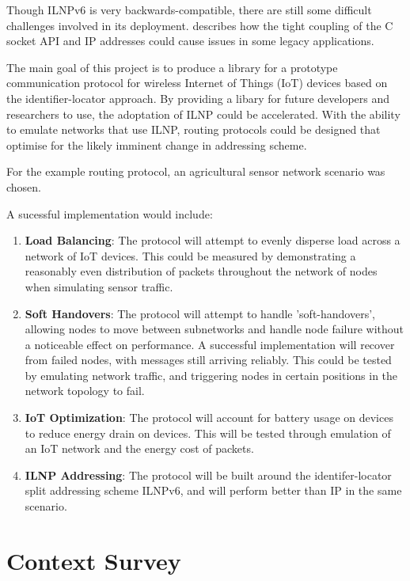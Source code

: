 \documentclass[12pt]{article}
\begin{document}
Though ILNPv6 is very backwards-compatible, there are still some difficult challenges involved in its deployment. \cite{ipwithoutip} describes how the tight coupling of the C socket API and IP addresses could cause issues in some legacy applications. 

The main goal of this project is to produce a library for a prototype communication
protocol for wireless Internet of Things (IoT) devices based on the identifier-locator approach. By providing a libary for future developers and researchers to use, the adoptation of ILNP could be accelerated. With the ability to emulate networks that use ILNP, routing protocols could be designed that optimise for the likely imminent change in addressing scheme. 

For the example routing protocol, an agricultural sensor network scenario was chosen. 

\vspace{\baselineskip}
\noindent A sucessful implementation would include:

\begin{enumerate}
	\item \textbf{Load Balancing}: The protocol will attempt to evenly disperse load across a network of IoT
devices. This could be measured by demonstrating a reasonably even distribution of packets throughout the network of nodes when simulating sensor traffic. 
	\item \textbf{Soft Handovers}: The protocol will attempt to handle ’soft-handovers’, allowing nodes to
move between subnetworks and handle node failure without a noticeable effect on performance. A successful implementation will recover from failed nodes, with messages still arriving reliably. This could be tested by emulating network traffic, and triggering nodes in certain positions in the network topology to fail.

	\item \textbf{IoT Optimization}: The protocol will account for battery usage on devices to reduce energy drain
	on devices. This will be tested through emulation of an IoT network and the energy cost of packets.
	\item \textbf{ILNP Addressing}: The protocol will be built around the identifer-locator split addressing scheme ILNPv6, and will perform better than IP in the same scenario.
\end{enumerate}

\pagebreak
\section{Context Survey}
\end{document}
